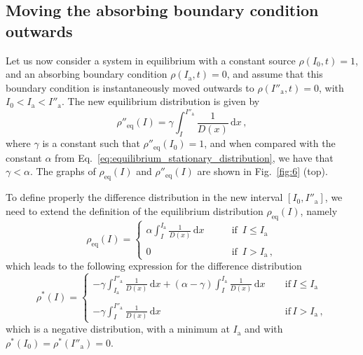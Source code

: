 
\subsection{Moving the absorbing boundary condition outwards}


Let us now consider a system in equilibrium with a constant source $\rho(I_0, t)=1$, and an absorbing boundary condition $\rho(I_\mathrm{a}, t)=0$, and assume that this boundary condition is instantaneously moved outwards to $\rho(I''_\mathrm{a}, t)=0$, with $I_0 < I_\mathrm{a} < I''_\mathrm{a}$. The new equilibrium distribution is given by
\begin{equation}
    \rho''_\text{eq}(I) = \gamma \int_I^{I''_\mathrm{a}} \frac{1}{D(x)}\,\mathrm{d}x\,,
\end{equation}
where $\gamma$ is a constant such that $\rho''_\text{eq}(I_0)=1$, and when compared with the constant $\alpha$ from Eq.~\eqref{eq:equilibrium_stationary_distribution}, we have that $\gamma < \alpha$. The graphs of $\rho_\text{eq}(I)$ and $\rho''_\text{eq}(I)$ are shown in Fig.~\ref{fig:6} (top). 

To define properly the difference distribution in the new interval $[I_0, I''_\mathrm{a}]$, we need to extend the definition of the equilibrium distribution $\rho_\text{eq}(I)$, namely
\begin{equation}
    \rho_\text{eq}(I) = 
    \left\{\begin{array}{lr}
        \alpha \displaystyle{\int_I^{I_\mathrm{a}} \frac{1}{D(x)}\,\mathrm{d}x} \qquad & \text{if } \, I \leq I_\mathrm{a} \\
        \\
        0 \qquad & \text{if } \, I > I_\mathrm{a}\,,
    \end{array}\right.
\end{equation}
which leads to the following expression for the difference distribution  
\begin{equation}
    \rho^\ast(I) = 
    \left\{\begin{array}{lr}
        - \gamma \displaystyle{\int_{I_\mathrm{a}}^{I''_\mathrm{a}} \frac{1}{D(x)}\,\mathrm{d}x + (\alpha - \gamma) \int_{I}^{I_\mathrm{a}} \frac{1}{D(x)}\,\mathrm{d}x}\ \quad &\text{if} \, I \leq I_\mathrm{a}\\
        \\
        - \gamma \displaystyle{\int_{I}^{I''_\mathrm{a}} \frac{1}{D(x)}\,\mathrm{d}x} \quad &\text{if} \, I > I_\mathrm{a}\,,
    \end{array}\right. 
    \label{eq:outward_difference}
\end{equation}
which is a negative distribution, with a minimum at $I_\mathrm{a}$ and with $\rho^\ast(I_0) = \rho^\ast(I''_\mathrm{a}) = 0$.

